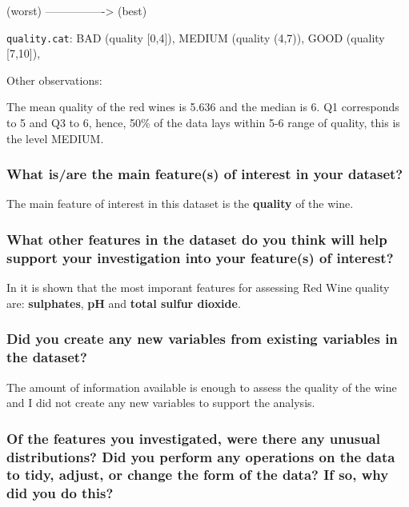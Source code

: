 \documentclass[]{article}
\begin{document}
(worst) ----------------\textgreater{} (best)

\texttt{quality.cat}: BAD (quality {[}0,4{]}), MEDIUM (quality (4,7)),
GOOD (quality {[}7,10{]}),

Other observations:

The mean quality of the red wines is 5.636 and the median is 6. Q1
corresponds to 5 and Q3 to 6, hence, 50\% of the data lays within 5-6
range of quality, this is the level MEDIUM.

\subsubsection{What is/are the main feature(s) of interest in your
dataset?}\label{what-isare-the-main-features-of-interest-in-your-dataset}

The main feature of interest in this dataset is the \textbf{quality} of
the wine.

\subsubsection{What other features in the dataset do you think will help
support your investigation into your feature(s) of
interest?}\label{what-other-features-in-the-dataset-do-you-think-will-help-support-your-investigation-into-your-features-of-interest}

In \citet{cortez2009modeling} it is shown that the most imporant
features for assessing Red Wine quality are: \textbf{sulphates},
\textbf{pH} and \textbf{total sulfur dioxide}.

\subsubsection{Did you create any new variables from existing variables
in the
dataset?}\label{did-you-create-any-new-variables-from-existing-variables-in-the-dataset}

The amount of information available is enough to assess the quality of
the wine and I did not create any new variables to support the analysis.

\subsubsection{Of the features you investigated, were there any unusual
distributions? Did you perform any operations on the data to tidy,
adjust, or change the form of the data? If so, why did you do
this?}\label{of-the-features-you-investigated-were-there-any-unusual-distributions-did-you-perform-any-operations-on-the-data-to-tidy-adjust-or-change-the-form-of-the-data-if-so-why-did-you-do-this}
\end{document}
